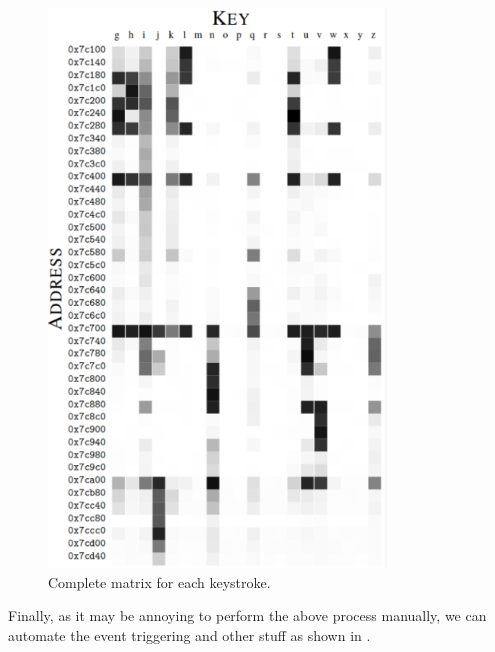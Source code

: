 \begin{figure}[!ht]
    \centering
    \includegraphics[width=0.8\textwidth]{images/cache-keymap-matrix.png}
    \caption{Complete matrix for each keystroke.}
    \label{fig:cache-keymap-matrix}
\end{figure}

Finally, as it may be annoying to perform the above process manually, we can automate the event triggering and other stuff as shown in \cite{GitGruss}.